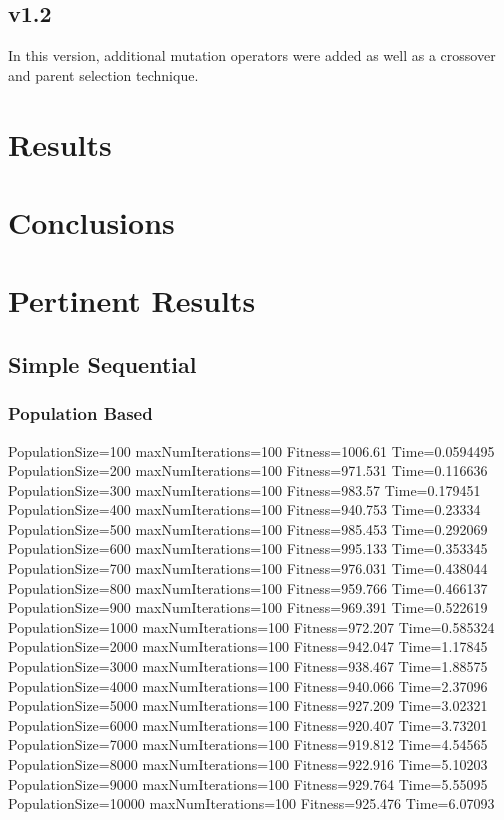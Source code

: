 \documentclass[10pt,letterpaper]{article}
\begin{document}
\subsection{v1.2}
In this version, additional mutation operators were added as well as a crossover and parent selection technique.


\section{Results}

\section{Conclusions}


\section{Pertinent Results}
\subsection{Simple Sequential}
\subsubsection{Population Based}
PopulationSize=100 maxNumIterations=100 Fitness=1006.61 Time=0.0594495
PopulationSize=200 maxNumIterations=100 Fitness=971.531 Time=0.116636
PopulationSize=300 maxNumIterations=100 Fitness=983.57 Time=0.179451
PopulationSize=400 maxNumIterations=100 Fitness=940.753 Time=0.23334
PopulationSize=500 maxNumIterations=100 Fitness=985.453 Time=0.292069
PopulationSize=600 maxNumIterations=100 Fitness=995.133 Time=0.353345
PopulationSize=700 maxNumIterations=100 Fitness=976.031 Time=0.438044
PopulationSize=800 maxNumIterations=100 Fitness=959.766 Time=0.466137
PopulationSize=900 maxNumIterations=100 Fitness=969.391 Time=0.522619
PopulationSize=1000 maxNumIterations=100 Fitness=972.207 Time=0.585324
PopulationSize=2000 maxNumIterations=100 Fitness=942.047 Time=1.17845
PopulationSize=3000 maxNumIterations=100 Fitness=938.467 Time=1.88575
PopulationSize=4000 maxNumIterations=100 Fitness=940.066 Time=2.37096
PopulationSize=5000 maxNumIterations=100 Fitness=927.209 Time=3.02321
PopulationSize=6000 maxNumIterations=100 Fitness=920.407 Time=3.73201
PopulationSize=7000 maxNumIterations=100 Fitness=919.812 Time=4.54565
PopulationSize=8000 maxNumIterations=100 Fitness=922.916 Time=5.10203
PopulationSize=9000 maxNumIterations=100 Fitness=929.764 Time=5.55095
PopulationSize=10000 maxNumIterations=100 Fitness=925.476 Time=6.07093
\end{document}
